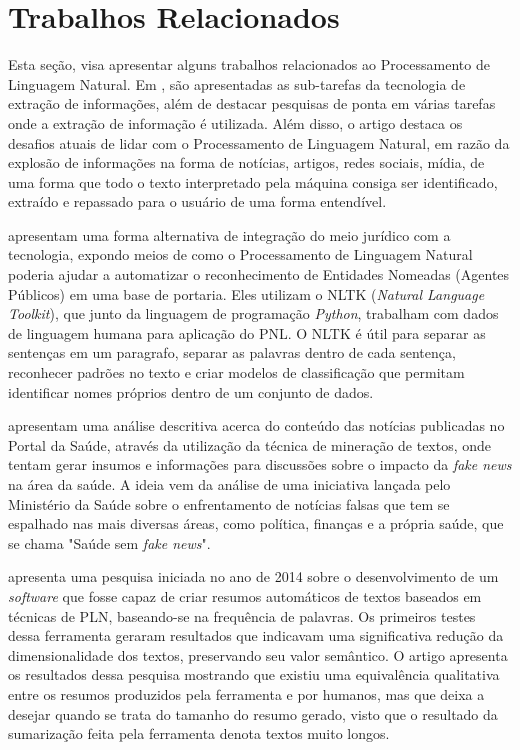 \section{Trabalhos Relacionados}
\label{sec:relatedWork}
Esta seção, visa apresentar alguns trabalhos relacionados ao Processamento de Linguagem Natural.
%
Em , são apresentadas as sub-tarefas da tecnologia de extração de informações, 
além de destacar pesquisas de ponta em várias tarefas onde a extração de informação é utilizada. Além disso, 
o artigo destaca os desafios atuais de lidar com o Processamento de Linguagem Natural, em razão da explosão 
de informações na forma de notícias, artigos, redes sociais, mídia, de uma forma que todo o texto 
interpretado pela máquina consiga ser identificado, extraído e repassado para o usuário de uma forma 
entendível.

 apresentam uma forma alternativa de integração do meio jurídico com a 
tecnologia, expondo meios de como o Processamento de Linguagem Natural poderia ajudar a automatizar o 
reconhecimento de Entidades Nomeadas (Agentes Públicos) em uma base de portaria. Eles utilizam o NLTK 
(\textit{Natural Language Toolkit}), que junto da linguagem de programação \textit{Python}, trabalham com 
dados de linguagem humana para aplicação do PNL. O NLTK é útil para separar as sentenças em um paragrafo, 
separar as palavras dentro de cada sentença, reconhecer padrões no texto e criar modelos de classificação que 
permitam identificar nomes próprios dentro de um conjunto de dados.

 apresentam uma análise descritiva acerca do conteúdo das notícias publicadas 
no Portal da Saúde, através da utilização da técnica de mineração de textos, onde tentam gerar insumos e 
informações para discussões sobre o impacto da \textit{fake news} na área da saúde. A ideia vem da análise de 
uma iniciativa lançada pelo Ministério da Saúde sobre o enfrentamento de notícias falsas que tem se espalhado 
nas mais diversas áreas, como política, finanças e a própria saúde, que se chama "Saúde sem 
\textit{fake news}".

 apresenta uma pesquisa iniciada no ano de 2014 sobre o desenvolvimento de 
um \textit{software} que fosse capaz de criar resumos automáticos de textos baseados em técnicas de PLN, 
baseando-se na frequência de palavras. Os primeiros testes dessa ferramenta geraram resultados que indicavam 
uma significativa redução da dimensionalidade dos textos, preservando seu valor semântico. O artigo apresenta 
os resultados dessa pesquisa mostrando que existiu uma equivalência qualitativa entre os resumos produzidos 
pela ferramenta e por humanos, mas que deixa a desejar quando se trata do tamanho do resumo gerado, visto que 
o resultado da sumarização feita pela ferramenta denota textos muito longos.

